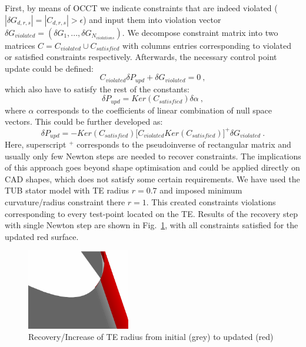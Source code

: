 \documentclass[9pt,academicons]{article}
\begin{document}
First, by means of OCCT we indicate constraints that are indeed violated ($|\delta G_{d,r,s}| = |C_{d,r,s}| > \epsilon$) and input them into violation vector $\delta G_{violated} = (\delta G_1, ...,\delta G_{N_{violations}})$. We decompose constraint matrix into two matrices $C = C_{violated} \cup C_{satisfied}$ with columns entries corresponding to violated or satisfied constraints respectively. Afterwards, the necessary control point update could be defined: 
\begin{equation}
C_{violated} {\delta}P_{upd} + {\delta}G_{violated} = 0 \:,
\end{equation}
which also have to satisfy the rest of the constants:
\begin{equation}
{\delta}P_{upd} = Ker (C_{satisfied}) \delta {\alpha}\:,
\end{equation}
where $\alpha$ corresponds to the coefficients of linear combination of null space vectors.
This could be further developed as: 
\begin{equation}
{\delta}P_{upd} = -  Ker (C_{satisfied}) {\big[ C_{violated}  Ker (C_{satisfied})\big]}^{+} {\delta}G_{violated}\:.
\end{equation}
Here, superscript $^+$ corresponds to the pseudoinverse of rectangular matrix and usually only few Newton steps are needed to recover constraints.  
The implications of this approach goes beyond shape optimisation and could be applied directly on CAD shapes, which does not satisfy some certain requirements. We have used the TUB stator model with TE radius $r = 0.7$ and imposed minimum curvature/radius constraint there $r = 1$. This created constraints violations corresponding to every test-point located on the TE. Results of the recovery step with single Newton step are shown in Fig.~\ref{fig:recovery}, with all constraints satisfied for the updated red surface. 
\begin{figure}[!ht]
\begin{center}
\includegraphics[width = 0.4\textwidth]{img/UpdatedCurvature.pdf}
\caption{Recovery/Increase of TE radius from initial (grey) to updated (red)}
\label{fig:recovery}
\end{center}
\end{figure}
\end{document}
